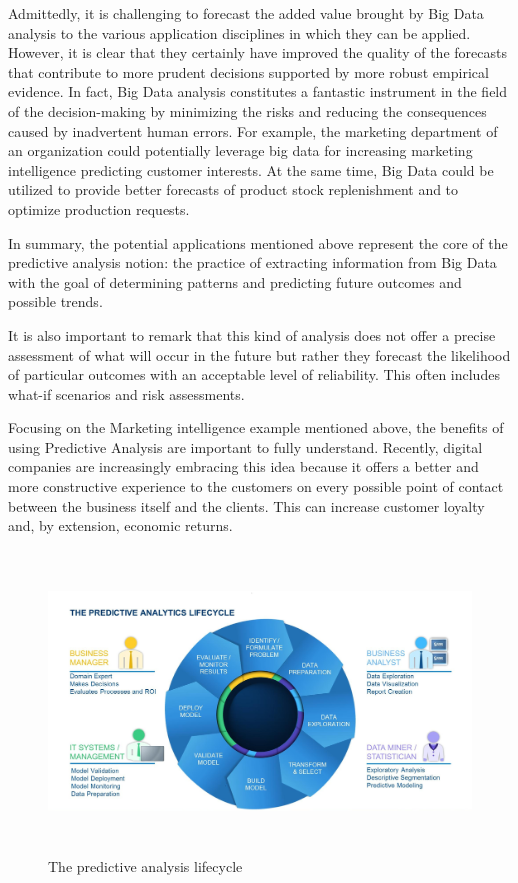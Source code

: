 Admittedly, it is challenging to forecast the added value brought by Big Data analysis to the various application disciplines in which they can be applied. However, it is clear that they certainly have improved the quality of the forecasts that contribute to more prudent decisions supported by more robust empirical evidence. 
In fact, Big Data analysis constitutes a fantastic instrument in the field of the decision-making by minimizing the risks and reducing the consequences caused by inadvertent human errors. For example, the marketing department of an organization could potentially leverage big data for increasing marketing intelligence predicting customer interests. At the same time, Big Data could be utilized to provide better forecasts of product stock replenishment and to optimize production requests.

In summary, the potential applications mentioned above represent the core of the predictive analysis notion: the practice of extracting information from Big Data with the goal of determining patterns and predicting future outcomes and possible trends. 

It is also important to remark that this kind of analysis does not offer a precise assessment of what will occur in the future but rather they forecast the likelihood of particular outcomes with an acceptable level of reliability. This often includes what-if scenarios and risk assessments.

Focusing on the Marketing intelligence example mentioned above, the benefits of using Predictive Analysis are important to fully understand. Recently, digital companies are increasingly embracing this idea because it offers a better and more constructive experience to the customers on every possible point of contact between the business itself and the clients. This can increase customer loyalty and, by extension, economic returns.

\vspace{0.5cm}
\begin{figure}[htbp]
  \centering
    \includegraphics[height=8cm]{images/pa-lifecycle.jpg}
  \caption{The predictive analysis lifecycle }
  \label{fig:predictive-analysis}
\end{figure}
\vspace{0.5cm}


